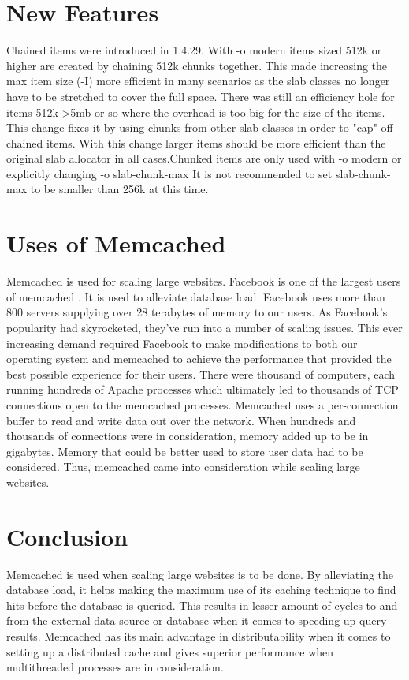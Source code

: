 \documentclass[9pt,twocolumn,twoside]{../../styles/osajnl}
\begin{document}
\section{New Features}
Chained items were introduced in 1.4.29. With -o modern items sized
512k or higher are created by chaining 512k chunks together. This made
increasing the max item size (-I) more efficient in many scenarios as
the slab classes no longer have to be stretched to cover the full
space. There was still an efficiency hole for items 512k->5mb or so
where the overhead is too big for the size of the items. This change
fixes it by using chunks from other slab classes in order to "cap" off
chained items. With this change larger items should be more efficient
than the original slab allocator in all cases.Chunked items are only
used with -o modern or explicitly changing -o slab-chunk-max It is not
recommended to set slab-chunk-max to be smaller than 256k at this
time.

\section{Uses of Memcached}
Memcached is used for scaling large websites. Facebook is one of the
largest users of memcached \cite{www-memcached-facebook}. It is used
to alleviate database load. Facebook uses more than 800 servers
supplying over 28 terabytes of memory to our users.  As Facebook's
popularity had skyrocketed, they've run into a number of scaling
issues. This ever increasing demand required Facebook to make
modifications to both our operating system and memcached to achieve
the performance that provided the best possible experience for their
users. There were thousand of computers, each running hundreds of
Apache processes which ultimately led to thousands of TCP connections
open to the memcached processes.  Memcached uses a per-connection
buffer to read and write data out over the network. When hundreds and
thousands of connections were in consideration, memory added up to be
in gigabytes. Memory that could be better used to store user data had
to be considered. Thus, memcached came into consideration while
scaling large websites.

\section{Conclusion}
Memcached is used when scaling large websites is to be done. By
alleviating the database load, it helps making the maximum use of its
caching technique to find hits before the database is queried. This
results in lesser amount of cycles to and from the external data
source or database when it comes to speeding up query results. Memcached
has its main advantage in distributability when it comes to setting up
a distributed cache and gives superior performance when multithreaded
processes are in consideration.



\end{document}
